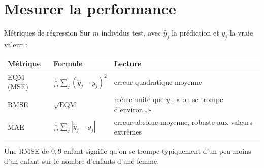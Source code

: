 \documentclass[aspectratio=169,11pt]{beamer}
\begin{document}
\section{Mesurer la performance}

\begin{frame}{Métriques de régression}
  Sur $m$ individus test, avec $\hat y_j$ la prédiction et $y_j$ la vraie valeur :
  \begin{center}
    \renewcommand{\arraystretch}{1.6}
    \begin{tabular}{lll}
      \toprule
      \textbf{Métrique} & \textbf{Formule} & \textbf{Lecture} \\
      \midrule
      EQM (MSE) & $\frac1m\sum_j(\hat y_j-y_j)^2$ & erreur quadratique moyenne \\
      RMSE & $\sqrt{\mathrm{EQM}}$ & même unité que $y$ : « on se trompe d'environ\dots » \\
      MAE & $\frac1m\sum_j|\hat y_j-y_j|$ & erreur absolue moyenne, robuste aux valeurs extrêmes \\
      \bottomrule
    \end{tabular}
  \end{center}
  \begin{exemple}
    Une RMSE de $0{,}9$ enfant signifie qu'on se trompe typiquement d'un peu moins d'un enfant sur le nombre d'enfants d'une femme.
  \end{exemple}
\end{frame}
\end{document}
